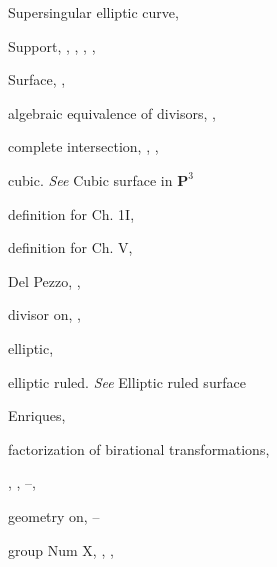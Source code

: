 {{\noindent\hspace*{0.0bp}Supersingular elliptic curve, \par
\noindent\hspace*{0.0bp}Support, , , , , \par
\noindent\hspace*{0.0bp}Surface, , \par
\noindent\hspace*{7.5bp}algebraic equivalence of divisors, , \par
\noindent\hspace*{7.5bp}complete intersection, , , \par
\noindent\hspace*{7.5bp}cubic. \emph{See} Cubic surface in $\mathbf P^3$\par
\noindent\hspace*{7.5bp}definition for Ch. 1I, \par
\noindent\hspace*{7.5bp}definition for Ch. V, \par
\noindent\hspace*{7.5bp}Del Pezzo, , \par
\noindent\hspace*{7.5bp}divisor on, , \par
\noindent\hspace*{7.5bp}elliptic, \par
\noindent\hspace*{7.5bp}elliptic ruled. \emph{See} Elliptic ruled surface\par
\noindent\hspace*{7.5bp}Enriques, \par
\noindent\hspace*{7.5bp}factorization of birational transformations,\par
\noindent\hspace*{15.0bp}, , --, \par
\noindent\hspace*{7.5bp}geometry on, --\par
\noindent\hspace*{7.5bp}group Num X, , , \par
}}
